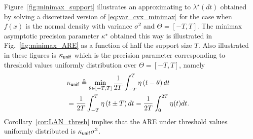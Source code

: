 \par
Figure~\ref{fig:minimax_support} illustrates an approximating to $\lambda^\star(dt)$ obtained by solving a discretized version of \eqref{eq:var_cvx_minimax} for the case when $f(x)$ is the normal density with variance $\sigma^2$ and $\Theta = [-T,T]$. The minimax asymptotic precision parameter $\kappa^\star$ obtained this way is illustrated in Fig.~\ref{fig:minimax_ARE} as a function of half the support size $T$. Also illustrated in these figures is $\kappa_{\mathsf{unif}}$ which is the precision parameter corresponding to threshold values uniformly distribution over $\Theta = [-T,T]$, namely
\begin{align}
& \kappa_{\mathsf{unif}} \triangleq \min_{\theta \in [-T,T]} \frac{1}{2T}\int_{-T}^T \eta\left(t-\theta\right) dt \nonumber
 \\
& = 
\frac{1}{2T}\int_{-T}^{T} \eta\left(t\pm T\right) dt
= \frac{1}{2T}\int_{0}^{2T} \eta(t) dt  \label{eq:uniform_risk}. 
\end{align}
Corollary~\ref{cor:LAN_thresh} implies that the ARE under threshold values uniformly distributed is $\kappa_{\mathsf{unif}} \sigma^2$. \par

